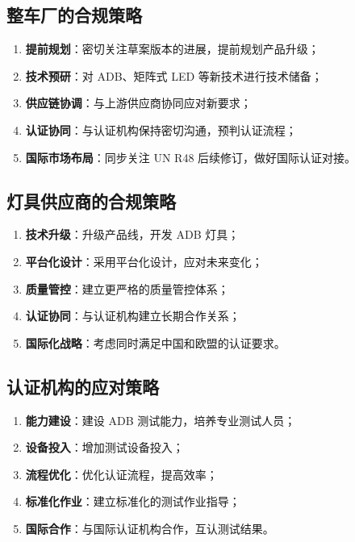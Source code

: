 \subsection{整车厂的合规策略}

\begin{enumerate}[leftmargin=2em]
    \item \textbf{提前规划}：密切关注草案版本的进展，提前规划产品升级；
    \item \textbf{技术预研}：对 ADB、矩阵式 LED 等新技术进行技术储备；
    \item \textbf{供应链协调}：与上游供应商协同应对新要求；
    \item \textbf{认证协同}：与认证机构保持密切沟通，预判认证流程；
    \item \textbf{国际市场布局}：同步关注 UN R48 后续修订，做好国际认证对接。
\end{enumerate}

\subsection{灯具供应商的合规策略}

\begin{enumerate}[leftmargin=2em]
    \item \textbf{技术升级}：升级产品线，开发 ADB 灯具；
    \item \textbf{平台化设计}：采用平台化设计，应对未来变化；
    \item \textbf{质量管控}：建立更严格的质量管控体系；
    \item \textbf{认证协同}：与认证机构建立长期合作关系；
    \item \textbf{国际化战略}：考虑同时满足中国和欧盟的认证要求。
\end{enumerate}

\subsection{认证机构的应对策略}

\begin{enumerate}[leftmargin=2em]
    \item \textbf{能力建设}：建设 ADB 测试能力，培养专业测试人员；
    \item \textbf{设备投入}：增加测试设备投入；
    \item \textbf{流程优化}：优化认证流程，提高效率；
    \item \textbf{标准化作业}：建立标准化的测试作业指导；
    \item \textbf{国际合作}：与国际认证机构合作，互认测试结果。
\end{enumerate}

